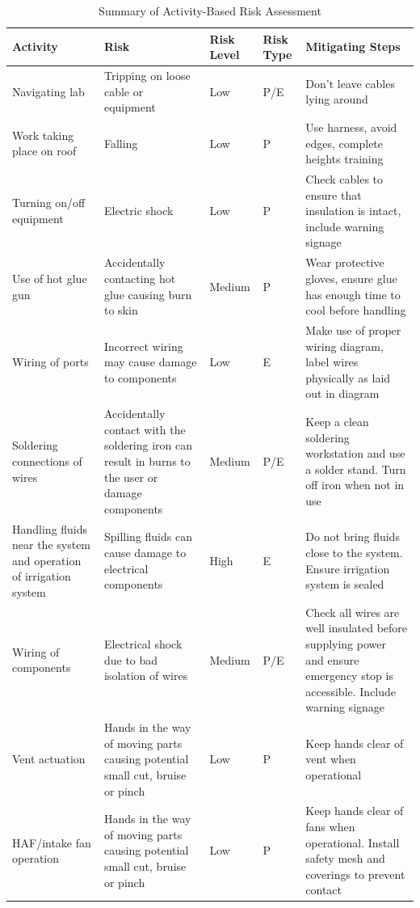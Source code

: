 \begin{table}[H]
\footnotesize
\centering
\small
\caption{Summary of Activity-Based Risk Assessment}
\begin{tabularx}{\textwidth}{|p{2.3cm}|X|p{1.1cm}|p{1cm}|X|}
\hline
\rowcolor[HTML]{EFEFEF}
\textbf{Activity} & \textbf{Risk} & \textbf{Risk Level} & \textbf{Risk Type} & \textbf{Mitigating Steps} \\
\hline
Navigating lab & Tripping on loose cable or equipment & Low & P/E & Don’t leave cables lying around \\
\hline
Work taking place on roof & Falling & Low & P & Use harness, avoid edges, complete heights training \\
\hline
Turning on/off equipment & Electric shock & Low & P & Check cables to ensure that insulation is intact, include warning signage \\
\hline
Use of hot glue gun & Accidentally contacting hot glue causing burn to skin & Medium & P & Wear protective gloves, ensure glue has enough time to cool before handling \\
\hline
Wiring of ports & Incorrect wiring may cause damage to components & Low & E & Make use of proper wiring diagram, label wires physically as laid out in diagram \\
\hline
Soldering connections of wires & Accidentally contact with the soldering iron can result in burns to the user or damage components & Medium & P/E & Keep a clean soldering workstation and use a solder stand. Turn off iron when not in use \\
\hline
Handling fluids near the system and operation of irrigation system & Spilling fluids can cause damage to electrical components & High & E & Do not bring fluids close to the system. Ensure irrigation system is sealed \\
\hline
Wiring of components & Electrical shock due to bad isolation of wires & Medium & P/E & Check all wires are well insulated before supplying power and ensure emergency stop is accessible. Include warning signage \\
\hline
Vent actuation & Hands in the way of moving parts causing potential small cut, bruise or pinch & Low & P & Keep hands clear of vent when operational \\
\hline
HAF/intake fan operation & Hands in the way of moving parts causing potential small cut, bruise or pinch & Low & P & Keep hands clear of fans when operational. Install safety mesh and coverings to prevent contact \\
\hline
\end{tabularx}
\end{table}

